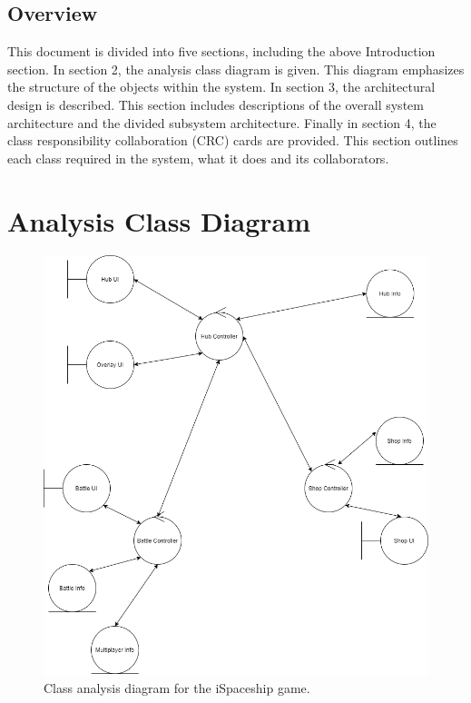 \documentclass[]{article}
\begin{document}
\subsection{Overview}
\label{sub:overview}
This document is divided into five sections, including the above Introduction section.
In section 2, the analysis class diagram is given. This diagram emphasizes the structure of the objects within
the system.
In section 3, the architectural design is described. This section includes descriptions of the overall system
architecture and the divided subsystem architecture.
Finally in section 4, the class responsibility collaboration (CRC) cards are provided. This section outlines
each class required in the system, what it does and its collaborators.


\section{Analysis Class Diagram}
\label{sec:analysis_class_diagram}

\begin{figure}[H]
    \centering
    \includegraphics[width=\textwidth]{ClassAnalysis.png}
    \caption{Class analysis diagram for the iSpaceship game.}
    \label{fig:ca}
\end{figure}
\end{document}
